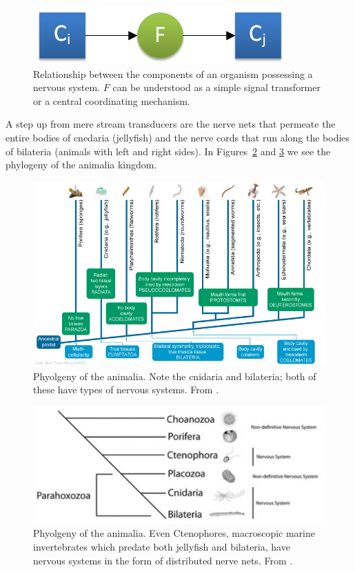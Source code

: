 \begin{figure}
	\centering
	\includegraphics{figs/nervousSystem.png}
	\caption{Relationship between the components of an organism possessing a nervous system. $F$ can be understood as a simple signal transformer or a central coordinating mechanism.}
	\label{fig:nervousSystem}
\end{figure}

A step up from mere stream transducers are the nerve nets that permeate the entire bodies of cnedaria (jellyfish) and the nerve cords that run along the bodies of bilateria (animals with left and right sides). In Figures~\ref{fig:animalia} and \ref{fig:animalia2} we see the phylogeny of the animalia kingdom.

\begin{figure}
	\centering
	\includegraphics[width=\textwidth]{Figs/animalia.jpg}
	\caption{Phyolgeny of the animalia. Note the cnidaria and bilateria; both of these have types of nervous systems. From \cite{animalia}.}
	\label{fig:animalia}
\end{figure}

\begin{figure}
	\centering
	\includegraphics[width=\textwidth]{Figs/animalia2.png}
	\caption{Phyolgeny of the animalia. Even Ctenophores, macroscopic marine invertebrates which predate both jellyfish and bilateria, have nervous systems in the form of distributed nerve nets. From \cite{animalia2}.}
	\label{fig:animalia2}
\end{figure}

